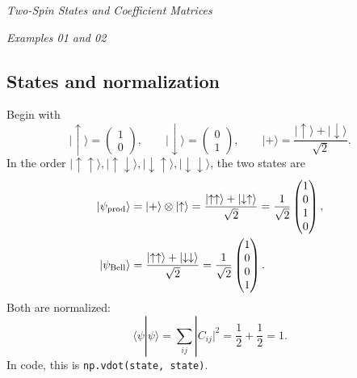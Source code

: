 \documentclass[11pt]{article}
\newcommand{\ket}[1]{\lvert #1\rangle}
\newcommand{\vfour}[4]{\begin{pmatrix}#1\\#2\\#3\\#4\end{pmatrix}}
\newcommand{\heading}[1]{\begin{center}\large\textit{#1}\end{center}}
\begin{document}
\heading{Two-Spin States and Coefficient Matrices}
\textit{Examples 01 and 02}

\subsection*{States and normalization}
Begin with
\begin{equation}
\ket{\uparrow}=\begin{pmatrix}1\\0\end{pmatrix},\qquad
\ket{\downarrow}=\begin{pmatrix}0\\1\end{pmatrix},\qquad
\ket{+}=\frac{\ket{\uparrow}+\ket{\downarrow}}{\sqrt2}.
\end{equation}
In the order $\ket{\uparrow\uparrow},\ket{\uparrow\downarrow},
\ket{\downarrow\uparrow},\ket{\downarrow\downarrow}$, the two states are
\begin{align}
\ket{\psi_{\rm prod}}
&=\ket{+}\otimes\ket{\uparrow}
=\frac{\ket{\uparrow\uparrow}+\ket{\downarrow\uparrow}}{\sqrt2}
=\frac1{\sqrt2}\vfour{1}{0}{1}{0},\\
\ket{\psi_{\rm Bell}}
&=\frac{\ket{\uparrow\uparrow}+\ket{\downarrow\downarrow}}{\sqrt2}
=\frac1{\sqrt2}\vfour{1}{0}{0}{1}.
\end{align}
Both are normalized:
\begin{equation}
\langle\psi|\psi\rangle=\sum_{ij}|C_{ij}|^2
=\frac12+\frac12=1.
\end{equation}
In code, this is \texttt{np.vdot(state, state)}.
\end{document}
